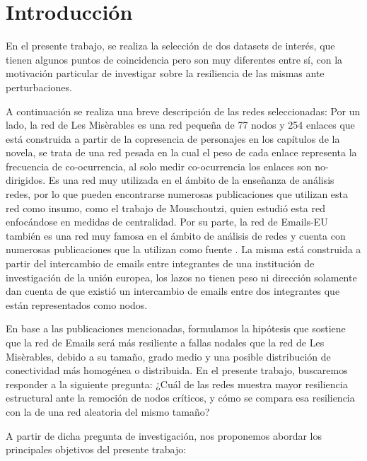 \documentclass[conference]{IEEEtran}
\begin{document}
\section{\textbf{Introducción}}

En el presente trabajo, se realiza la selección de dos datasets de interés, que tienen algunos puntos de coincidencia pero son muy diferentes entre sí, con la motivación particular de investigar sobre la resiliencia de las mismas ante perturbaciones. 

A continuación se realiza una breve descripción de las redes seleccionadas:
Por un lado, la red de Les Misèrables es una red pequeña de 77 nodos y 254 enlaces que está construida a partir de la copresencia de personajes en los capítulos de la novela, se trata de una red pesada en la cual el peso de cada enlace representa la frecuencia de co-ocurrencia, al solo medir co-ocurrencia los enlaces son no-dirigidos. Es una red muy utilizada en el ámbito de la enseñanza de análisis redes, por lo que pueden encontrarse numerosas publicaciones que utilizan esta red como insumo, como el trabajo de  Mouschoutzi\cite{mouschoutzi2024}, quien estudió esta red enfocándose en medidas de centralidad. 
Por su parte, la red de Emails-EU también es una red muy famosa en el ámbito de análisis de redes y cuenta con numerosas publicaciones que la utilizan como fuente \cite{nr}. La misma está construida a partir del intercambio de emails entre integrantes de una institución de investigación de la unión europea, los lazos no tienen peso ni dirección solamente dan cuenta de que existió un intercambio de emails entre dos integrantes que están representados como nodos.

En base a las publicaciones mencionadas, formulamos la hipótesis que sostiene que la red de Emails será más resiliente a fallas nodales que la red de Les Misèrables, debido a su tamaño, grado medio y una posible distribución de conectividad más homogénea o distribuida. En el presente trabajo, buscaremos responder a la siguiente pregunta: ¿Cuál de las redes muestra mayor resiliencia estructural ante la remoción de nodos críticos, y cómo se compara esa resiliencia con la de una red aleatoria del mismo tamaño?

A partir de dicha pregunta de investigación, nos proponemos abordar los principales objetivos del presente trabajo:
\end{document}

